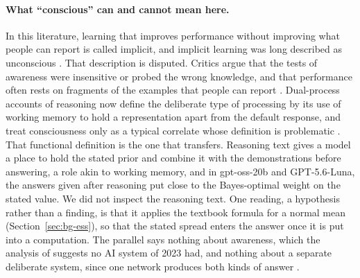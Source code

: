 \paragraph{What ``conscious'' can and cannot mean here.} In this literature, learning that improves performance without improving what people can report is called implicit, and implicit learning was long described as unconscious \citep{reber1967}. That description is disputed. Critics argue that the tests of awareness were insensitive or probed the wrong knowledge, and that performance often rests on fragments of the examples that people can report \citep{shanks1994, perruchet1990, vadillo2016}. Dual-process accounts of reasoning now define the deliberate type of processing by its use of working memory to hold a representation apart from the default response, and treat consciousness only as a typical correlate whose definition is problematic \citep{evans2013}. That functional definition is the one that transfers. Reasoning text gives a model a place to hold the stated prior and combine it with the demonstrations before answering, a role akin to working memory, and in gpt-oss-20b and GPT-5.6-Luna, the answers given after reasoning put close to the Bayes-optimal weight on the stated value. We did not inspect the reasoning text. One reading, a hypothesis rather than a finding, is that it applies the textbook formula for a normal mean (Section~\ref{sec:bg-ess}), so that the stated spread enters the answer once it is put into a computation. The parallel says nothing about awareness, which the analysis of \citet{butlin2023} suggests no AI system of 2023 had, and nothing about a separate deliberate system, since one network produces both kinds of answer \citep{lampinen2024content}.

